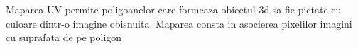 	\tab Maparea UV permite poligoanelor care formeaza obiectul 3d sa fie pictate cu culoare dintr-o imagine obisnuita. Maparea consta in asocierea pixelilor imagini cu suprafata de pe poligon